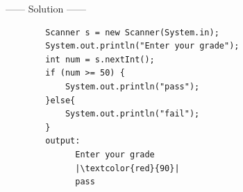    \begin{example}
      
      \begin{center}
        ------ \textcolor{Solution}{Solution} ------ 
      \end{center} 

      \begin{verbatim}
        Scanner s = new Scanner(System.in);
        System.out.println("Enter your grade");
        int num = s.nextInt();
        if (num >= 50) {
            System.out.println("pass");
        }else{
            System.out.println("fail");
        }
        output:
              Enter your grade
              |\textcolor{red}{90}|
              pass
        
      \end{verbatim}
    \end{example}

